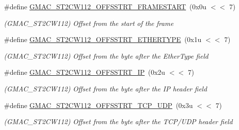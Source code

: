 \begin{DoxyCompactItemize}
\item 
\mbox{\label{group__SAME70__GMAC_gaea86e801d2bbddd64107ebbecb644b79}} 
\#define \mbox{\hyperlink{group__SAME70__GMAC_gaea86e801d2bbddd64107ebbecb644b79}{G\+M\+A\+C\+\_\+\+S\+T2\+C\+W112\+\_\+\+O\+F\+F\+S\+S\+T\+R\+T\+\_\+\+F\+R\+A\+M\+E\+S\+T\+A\+RT}}~(0x0u $<$$<$ 7)
\begin{DoxyCompactList}\small\item\em (G\+M\+A\+C\+\_\+\+S\+T2\+C\+W112) Offset from the start of the frame \end{DoxyCompactList}\item 
\mbox{\label{group__SAME70__GMAC_ga1d60d204a162ab3ca40db58f22e23c12}} 
\#define \mbox{\hyperlink{group__SAME70__GMAC_ga1d60d204a162ab3ca40db58f22e23c12}{G\+M\+A\+C\+\_\+\+S\+T2\+C\+W112\+\_\+\+O\+F\+F\+S\+S\+T\+R\+T\+\_\+\+E\+T\+H\+E\+R\+T\+Y\+PE}}~(0x1u $<$$<$ 7)
\begin{DoxyCompactList}\small\item\em (G\+M\+A\+C\+\_\+\+S\+T2\+C\+W112) Offset from the byte after the Ether\+Type field \end{DoxyCompactList}\item 
\mbox{\label{group__SAME70__GMAC_ga9dc70463c49d5b2a196757a4b5e48294}} 
\#define \mbox{\hyperlink{group__SAME70__GMAC_ga9dc70463c49d5b2a196757a4b5e48294}{G\+M\+A\+C\+\_\+\+S\+T2\+C\+W112\+\_\+\+O\+F\+F\+S\+S\+T\+R\+T\+\_\+\+IP}}~(0x2u $<$$<$ 7)
\begin{DoxyCompactList}\small\item\em (G\+M\+A\+C\+\_\+\+S\+T2\+C\+W112) Offset from the byte after the IP header field \end{DoxyCompactList}\item 
\mbox{\label{group__SAME70__GMAC_ga396ef35ffbd3075fbbcd5d6073558b96}} 
\#define \mbox{\hyperlink{group__SAME70__GMAC_ga396ef35ffbd3075fbbcd5d6073558b96}{G\+M\+A\+C\+\_\+\+S\+T2\+C\+W112\+\_\+\+O\+F\+F\+S\+S\+T\+R\+T\+\_\+\+T\+C\+P\+\_\+\+U\+DP}}~(0x3u $<$$<$ 7)
\begin{DoxyCompactList}\small\item\em (G\+M\+A\+C\+\_\+\+S\+T2\+C\+W112) Offset from the byte after the T\+C\+P/\+U\+DP header field \end{DoxyCompactList}\item 
\mbox{\label{group__SAME70__GMAC_ga353c35499945a9b71913f1066b8cab80}} 

\end{DoxyCompactItemize}
